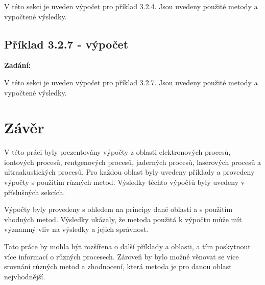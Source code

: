 \documentclass{article}
\newenvironment{zadani}
{\begin{center}\textbf{Zadání:}\itshape}{\end{center}}
\begin{document}
V této sekci je uveden výpočet pro příklad 3.2.4. Jsou uvedeny použité metody a vypočtené výsledky.

\subsection{Příklad 3.2.7 - výpočet}
\begin{zadani}

\end{zadani}


V této sekci je uveden výpočet pro příklad 3.2.7. Jsou uvedeny použité metody a vypočtené výsledky.

\section{Závěr}

V této práci byly prezentovány výpočty z oblasti elektronových procesů, iontových procesů, rentgenových procesů, 
jaderných procesů, laserových procesů a ultraakustických procesů. Pro každou oblast byly uvedeny příklady a provedeny výpočty s použitím různých metod. Výsledky těchto výpočtů byly uvedeny v příslušných sekcích.

Výpočty byly provedeny s ohledem na principy dané oblasti a s použitím vhodných metod. Výsledky ukázaly, že metoda použitá k výpočtu může mít významný vliv na výsledky a jejich správnost.

Tato práce by mohla být rozšířena o další příklady a oblasti, a tím poskytnout více informací o různých procesech. Zároveň by bylo možné věnovat se více srovnání různých metod a zhodnocení, která metoda je pro danou oblast nejvhodnější.
\end{document}
